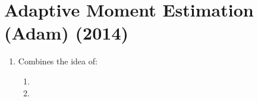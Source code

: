 


\section{Adaptive Moment Estimation (Adam) (2014) \cite{arxiv-1412.6980-adam}}\label{Adaptive Moment Estimation (Adam)}

\begin{enumerate}
    \item Combines the idea of:
    \begin{enumerate}
        \item {}
        \item {}
    \end{enumerate}
\end{enumerate}

